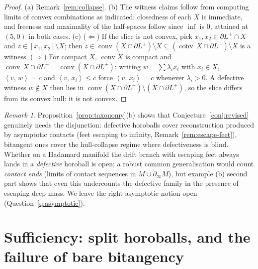 \documentclass[11pt]{article}
\theoremstyle{remark}
\newtheorem{remark}[theorem]{Remark}
\newcommand{\X}{X}
\newcommand{\conv}{\operatorname{conv}}
\newcommand{\cconv}[1]{\overline{\conv}\,#1}
\newcommand{\bdry}{\partial_{\infty}}
\newcommand{\sca}[2]{\left\langle #1,\, #2\right\rangle}
\begin{document}
\begin{proof}
(a) Remark~\ref{rem:collapse}. (b) The witness claims follow from
computing limits of convex combinations as indicated; closedness of
each $\X$ is immediate, and freeness and maximality of the half-spaces
follow since $\inf$ is $0$, attained at $(5,0)$ in both cases. (c)
($\Leftarrow$) If the slice is not convex, pick
$x_{1},x_{2}\in\partial L^{+}\cap\X$ and
$z\in[x_{1},x_{2}]\setminus\X$; then
$z\in\conv(\X\cap\partial L^{+})\setminus\X\subseteq
(\cconv\X\cap\partial L^{+})\setminus\X$ is a witness.
($\Rightarrow$) For compact
$\X$, $\conv\X$ is compact and
$\cconv\X\cap\partial L^{+}=\conv(\X\cap\partial L^{+})$: writing
$w=\sum\lambda_{i}x_{i}$ with $x_{i}\in\X$, $\sca{v}{w}=c$ and
$\sca{v}{x_{i}}\le c$ force $\sca{v}{x_{i}}=c$ whenever
$\lambda_{i}>0$. A defective witness $w\notin\X$ then lies in
$\conv(\X\cap\partial L^{+})\setminus(\X\cap\partial L^{+})$, so the
slice differs from its convex hull: it is not convex.
\end{proof}

\begin{remark}
Proposition~\ref{prop:taxonomy}(b) shows that
Conjecture~\ref{conj:revised} genuinely needs the disjunction:
defective horoballs cover reconstruction produced by asymptotic
contacts (feet escaping to infinity,
Remark~\ref{rem:escape-feet}), bitangent ones cover the
hull-collapse regime where defectiveness is blind. Whether on a
Hadamard manifold the drift branch with escaping feet always lands in
a \emph{defective} horoball is open; a robust common generalisation
would count \emph{contact ends} (limits of contact sequences in
$M\cup\bdry M$), but example (b) second part shows that even this
undercounts the defective family in the presence of escaping deep
mass. We leave the right asymptotic notion open
(Question~\ref{q:asymptotic}).
\end{remark}

\section{Sufficiency: split horoballs, and the failure of bare
bitangency}\label{sec:sufficiency}
\end{document}
